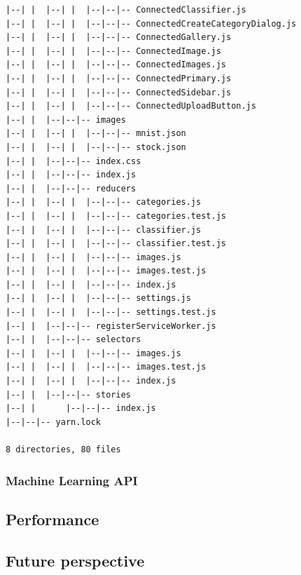 \begin{verbatim}
|--| |  |--| |  |--|--|-- ConnectedClassifier.js
|--| |  |--| |  |--|--|-- ConnectedCreateCategoryDialog.js
|--| |  |--| |  |--|--|-- ConnectedGallery.js
|--| |  |--| |  |--|--|-- ConnectedImage.js
|--| |  |--| |  |--|--|-- ConnectedImages.js
|--| |  |--| |  |--|--|-- ConnectedPrimary.js
|--| |  |--| |  |--|--|-- ConnectedSidebar.js
|--| |  |--| |  |--|--|-- ConnectedUploadButton.js
|--| |  |--|--|-- images
|--| |  |--| |  |--|--|-- mnist.json
|--| |  |--| |  |--|--|-- stock.json
|--| |  |--|--|-- index.css
|--| |  |--|--|-- index.js
|--| |  |--|--|-- reducers
|--| |  |--| |  |--|--|-- categories.js
|--| |  |--| |  |--|--|-- categories.test.js
|--| |  |--| |  |--|--|-- classifier.js
|--| |  |--| |  |--|--|-- classifier.test.js
|--| |  |--| |  |--|--|-- images.js
|--| |  |--| |  |--|--|-- images.test.js
|--| |  |--| |  |--|--|-- index.js
|--| |  |--| |  |--|--|-- settings.js
|--| |  |--| |  |--|--|-- settings.test.js
|--| |  |--|--|-- registerServiceWorker.js
|--| |  |--|--|-- selectors
|--| |  |--| |  |--|--|-- images.js
|--| |  |--| |  |--|--|-- images.test.js
|--| |  |--| |  |--|--|-- index.js
|--| |  |--|--|-- stories
|--| |      |--|--|-- index.js
|--|--|-- yarn.lock

8 directories, 80 files
\end{verbatim}

\subsubsection{Machine Learning API}

\subsection{Performance}

\subsection{Future perspective}




